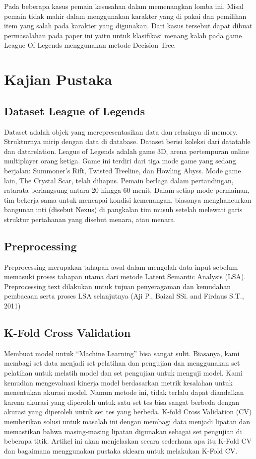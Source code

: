 \documentclass[conference]{IEEEtran}
\begin{document}
Pada beberapa kasus pemain kesusahan dalam memenangkan lomba ini. Misal pemain tidak mahir dalam menggunakan karakter yang di pakai dan pemilihan item yang salah pada karakter yang digunakan. Dari kasus tersebut dapat dibuat permasalahan pada paper ini yaitu untuk klasifikasi menang kalah pada game League Of Legends menggunakan metode Decision Tree.

\section{Kajian Pustaka}
\subsection{Dataset League of Legends}
Dataset adalah objek yang merepresentasikan data dan relasinya di memory. Strukturnya mirip dengan data di database. Dataset berisi koleksi dari datatable dan datarelation. League of Legends adalah game 3D, arena pertempuran online multiplayer orang ketiga. Game ini terdiri dari tiga mode game yang sedang berjalan: Summoner’s Rift, Twisted Treeline, dan Howling Abyss. Mode game lain, The Crystal Scar, telah dihapus. Pemain berlaga dalam pertandingan, ratarata berlangsung antara 20 hingga 60 menit. Dalam setiap mode permainan, tim bekerja sama untuk mencapai kondisi kemenangan, biasanya menghancurkan bangunan inti (disebut Nexus) di pangkalan tim musuh setelah melewati garis struktur pertahanan yang disebut menara, atau menara.

\subsection{Preprocessing}
Preprocessing merupakan tahapan awal dalam mengolah data input sebelum memasuki proses tahapan utama dari metode Latent Semantic Analysis (LSA). Preprocessing text dilakukan untuk tujuan penyeragaman dan kemudahan pembacaan serta proses LSA selanjutnya (Aji P., Baizal SSi. and Firdaus S.T., 2011)

\subsection{K-Fold Cross Validation}
Membuat model untuk “Machine Learning” bisa sangat sulit.  Biasanya, kami membagi set data menjadi set pelatihan dan pengujian dan menggunakan set pelatihan untuk melatih model dan set pengujian untuk menguji model.  Kami kemudian mengevaluasi kinerja model berdasarkan metrik kesalahan untuk menentukan akurasi model.  Namun metode ini, tidak terlalu dapat diandalkan karena akurasi yang diperoleh untuk satu set tes bisa sangat berbeda dengan akurasi yang diperoleh untuk set tes yang berbeda.  K-fold Cross Validation (CV) memberikan solusi untuk masalah ini dengan membagi data menjadi lipatan dan memastikan bahwa masing-masing lipatan digunakan sebagai set pengujian di beberapa titik.  Artikel ini akan menjelaskan secara sederhana apa itu K-Fold CV dan bagaimana menggunakan pustaka sklearn untuk melakukan K-Fold CV.
\end{document}
